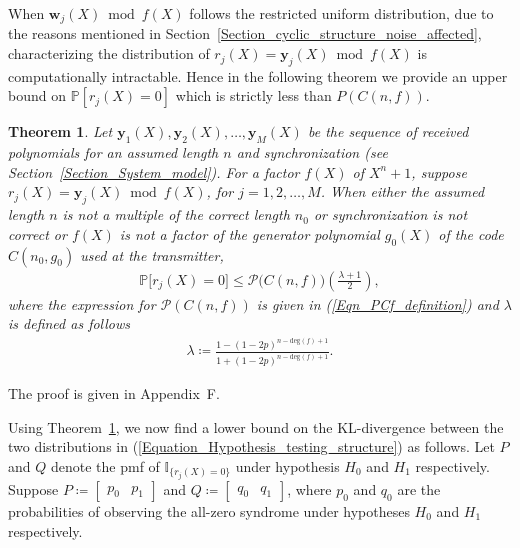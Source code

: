 \documentclass[10pt,journal]{IEEEtran}
\newtheorem{theorem}{Theorem}
\def \deg{{\mathrm{deg}}}
\begin{document}
When $\mathbf{w}_j(X) \bmod f(X)$ follows the restricted uniform distribution,
due to the reasons mentioned in Section~\ref{Section_cyclic_structure_noise_affected}, 
characterizing the distribution of $r_j(X) = \mathbf{y}_j(X) \bmod f(X)$
is computationally intractable.
Hence in the following theorem we provide an upper bound on $\mathbb{P}[r_j(X) = 0]$ which is strictly
less than $P(C(n,f))$.


\begin{theorem}
\label{Theorem_lower_bound_H1_PCnf}
%  
Let $\mathbf{y}_1(X), \mathbf{y}_2(X), \ldots, \mathbf{y}_M(X)$ be the sequence of received polynomials
for an assumed length $n$ and synchronization (see Section~\ref{Section_System_model}).
For a factor $f(X)$ of $X^n+1$, suppose $r_j(X) = \mathbf{y}_j(X) \bmod f(X)$, for $j = 1,2,\ldots,M$.
When either the assumed length $n$ is not a multiple of the correct length $n_0$ or synchronization is not correct or
$f(X)$ is not a factor of the generator polynomial $g_0(X)$ of the code $C(n_0,g_0)$ used at the transmitter,
% 
\begin{align}
% 
\mathbb{P} \big[r_j(X) = 0\big] \leq \mathcal{P}\big(C(n,f)\big) \left( \frac{\lambda + 1}{2} \right),
\label{Eqn_PCnf_UB_thm_eqn}
% 
\end{align}
% 
where the expression for $\mathcal{P}(C(n,f))$ is given in (\ref{Eqn_PCf_definition}) 
and $\lambda$ is defined as follows
% 
%  
\begin{align}
%  
\lambda \coloneqq \frac{1-(1-2p)^{n-\deg(f)+1}}{1+(1-2p)^{n-\deg(f)+1}}.
% 
\end{align}
% 
% 
\end{theorem}
% 
\begin{IEEEproof}
%  
The proof is given in Appendix~F. 
% 
\end{IEEEproof}
% 
Using Theorem~\ref{Theorem_lower_bound_H1_PCnf}, we now find a lower bound on the KL-divergence between
the two distributions in (\ref{Equation_Hypothesis_testing_structure}) as follows.
% 
Let $P$ and $Q$ denote the pmf of $\mathbb{I}_{\{{r}_j(X)=0\}}$ under hypothesis $H_0$ and $H_1$
respectively. 
Suppose $P \coloneqq \begin{bmatrix} p_0 & p_1 \end{bmatrix}$ and $Q \coloneqq \begin{bmatrix} q_0 & q_1 \end{bmatrix}$, 
where $p_0$ and $q_0$ are the probabilities of observing the all-zero syndrome under hypotheses $H_0$ and $H_1$ respectively.
\end{document}
